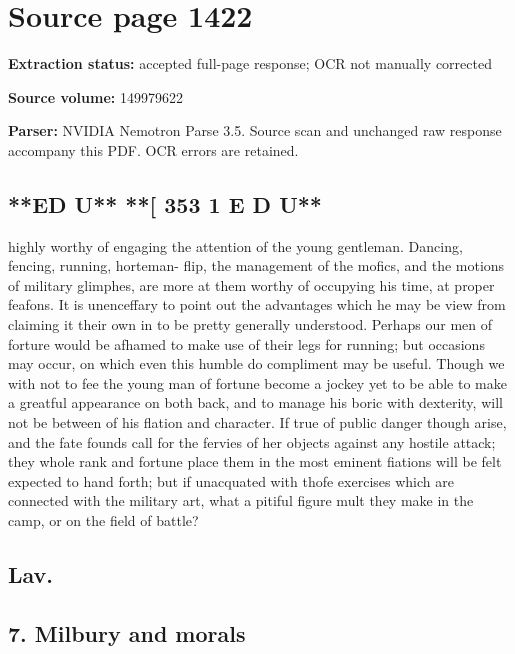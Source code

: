\clearpage
\section{Source page 1422}
\textbf{Extraction status:} accepted full-page response; OCR not manually corrected\par
\textbf{Source volume:} 149979622\par
\textbf{Parser:} NVIDIA Nemotron Parse 3.5. Source scan and unchanged raw response accompany this PDF. OCR errors are retained.\par\medskip
\subsection*{**ED U** **[ 353 1 E D U**}
highly worthy of engaging the attention of the young gentleman. Dancing, fencing, running, horteman- flip, the management of the mofics, and the motions of military glimphes, are more at them worthy of occupying his time, at proper feafons. It is unenceffary to point out the advantages which he may be view from claiming it their own in to be pretty generally understood. Perhaps our men of forture would be afhamed to make use of their legs for running; but occasions may occur, on which even this humble do compliment may be useful. Though we with not to fee the young man of fortune become a jockey yet to be able to make a greatful appearance on both back, and to manage his boric with dexterity, will not be between of his flation and character. If true of public danger though arise, and the fate founds call for the fervies of her objects against any hostile attack; they whole rank and fortune place them in the most eminent fiations will be felt expected to hand forth; but if unacquated with thofe exercises which are connected with the military art, what a pitiful figure mult they make in the camp, or on the field of battle?\par\medskip
\subsection*{Lav.}
\subsection*{7. Milbury and morals}
